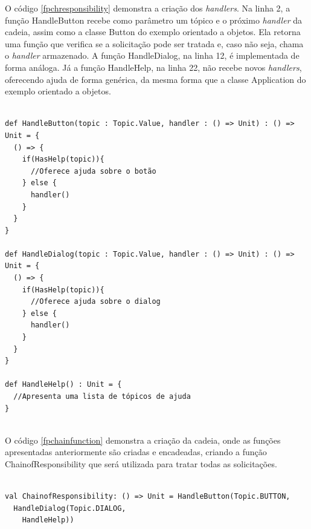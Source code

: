 O código \ref{fpchresponsibility} demonstra a 
criação dos \textit{handlers}. Na linha 2, a 
função HandleButton recebe como parâmetro um 
tópico e o próximo \textit{handler} da cadeia, 
assim como a classe Button do exemplo orientado 
a objetos. Ela retorna uma função que verifica 
se a solicitação pode ser tratada e, caso 
não seja, chama o \textit{handler} armazenado. 
A função HandleDialog, na linha 12, é 
implementada de forma análoga. Já a função 
HandleHelp, na linha 22, não recebe novos 
\textit{handlers}, oferecendo ajuda de forma 
genérica, da mesma forma que a classe 
Application do exemplo orientado a objetos.

\begin{lstlisting}[caption={Chain of Responsibility Funcional},label=fpchresponsibility]
    
def HandleButton(topic : Topic.Value, handler : () => Unit) : () => Unit = {
  () => {
    if(HasHelp(topic)){
      //Oferece ajuda sobre o botão
    } else {
      handler()
    }
  }
}

def HandleDialog(topic : Topic.Value, handler : () => Unit) : () => Unit = {
  () => {
    if(HasHelp(topic)){
      //Oferece ajuda sobre o dialog
    } else {
      handler()
    }
  }
}

def HandleHelp() : Unit = {
  //Apresenta uma lista de tópicos de ajuda
}
    
\end{lstlisting}

O código \ref{fpchainfunction} demonstra a criação 
da cadeia, onde as funções apresentadas anteriormente 
são criadas e encadeadas, criando a função 
ChainofResponsibility que será utilizada para 
tratar todas as solicitações.

\begin{lstlisting}[caption={Função Chain of Responsability},label=fpchainfunction]
    
val ChainofResponsibility: () => Unit = HandleButton(Topic.BUTTON,
  HandleDialog(Topic.DIALOG,
    HandleHelp))
      
\end{lstlisting}